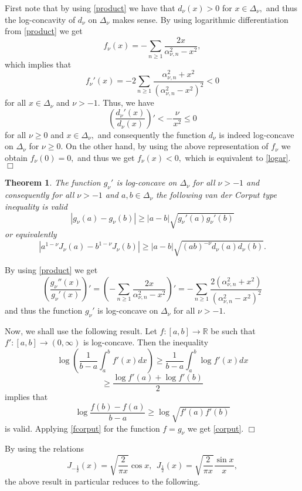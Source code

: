 \documentclass[journal]{IEEEtran}
\newtheorem{theorem}{Theorem}
\begin{document}
 First note that by using \eqref{product} we have that $d_{\nu}(x)>0$ for $x\in\Delta_{\nu},$ and thus the log-concavity of $d_{\nu}$
on $\Delta_{\nu}$ makes sense. By using logarithmic differentiation from \eqref{product} we get
$$f_{\nu}(x)=-\sum_{n\geq1}\frac{2x}{\alpha_{\nu,n}^2-x^2},$$
which implies that
$$f_{\nu}'(x)=-2\sum_{n\geq 1}\frac{\alpha_{\nu,n}^2+x^2}{(\alpha_{\nu,n}^2-x^2)^2}<0$$
for all $x\in\Delta_{\nu}$ and $\nu>-1.$ Thus, we have
$$\left(\frac{d_{\nu}'(x)}{d_{\nu}(x)}\right)'<-\frac{\nu}{x^2}\leq0$$
for all $\nu\geq 0$ and $x\in\Delta_{\nu},$ and consequently the function $d_{\nu}$ is indeed log-concave on $\Delta_{\nu}$ for $\nu\geq0.$
On the other hand, by using the above representation of $f_{\nu}$ we obtain $f_{\nu}(0)=0,$ and thus we get $f_{\nu}(x)<0,$ which is equivalent to
\eqref{logar}. \medskip \hfill $\Box$

\begin{theorem}
{\em The function $g_{\nu}'$ is log-concave on $\Delta_{\nu}$ for all $\nu>-1$ and consequently for all $\nu>-1$ and $a,b\in\Delta_{\nu}$ the following van der Corput type inequality is valid
\begin{equation}\label{corput}\left|g_{\nu}(a)-g_{\nu}(b)\right|\geq |a-b|\sqrt{g_{\nu}'(a)g_{\nu}'(b)}\end{equation}
or equivalently
$$\left|a^{1-\nu}J_{\nu}(a)-b^{1-\nu}J_{\nu}(b)\right|\geq |a-b|\sqrt{(ab)^{-\nu}d_{\nu}(a)d_{\nu}(b)}.$$}
\end{theorem}

 By using \eqref{product} we get
$$\left(\frac{g_{\nu}''(x)}{g_{\nu}'(x)}\right)'=\left(-\sum_{n\geq 1}\frac{2x}{\alpha_{\nu,n}^2-x^2}\right)'=-\sum_{n\geq 1}\frac{2(\alpha_{\nu,n}^2+x^2)}{(\alpha_{\nu,n}^2-x^2)^2}$$
and thus the function $g_{\nu}'$ is log-concave on $\Delta_{\nu}$ for all $\nu>-1.$

Now, we shall use the following result. Let $f:[a,b]\to\mathbb{R}$ be such that $f':[a,b]\to(0,\infty)$ is log-concave. Then the inequality \cite[p. 242]{corput}
$$\log\left(\frac{1}{b-a}\int_a^bf'(x)dx\right)\geq \frac{1}{b-a}\int_a^b\log f'(x)dx$$
$$\geq\frac{\log f'(a)+\log f'(b)}{2}$$
implies that
\begin{equation}\label{fcorput}\log \frac{f(b)-f(a)}{b-a}\geq \log\sqrt{f'(a)f'(b)}\end{equation}
is valid. Applying \eqref{fcorput} for the function $f=g_{\nu}$ we get \eqref{corput}. \medskip \hfill $\Box$

By using the relations
$$J_{-\frac{1}{2}}(x)=\sqrt{\frac{2}{\pi x}}\cos x, \ \ J_{\frac{1}{2}}(x)=\sqrt{\frac{2}{\pi x}}\frac{\sin x}{x},$$
the above result in particular reduces to the following.
\end{document}
